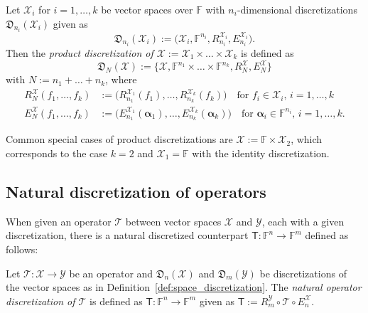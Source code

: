 \documentclass[a4paper]{paper}
\newcommand{\Discr}{\mathfrak{D}}
\newcommand{\Spc}[1]{\mathscr{#1}}
\newcommand{\Field}{\mathbb{F}}
\newcommand{\Op}[1]{\mathcal{#1}}
\newcommand{\DiscOp}[1]{\mathsf{#1}}
\newcommand*{\EXT}[2]{\ensuremath{E_{#1}^{#2}}}
\newcommand*{\REST}[2]{\ensuremath{R_{#1}^{#2}}}
\newcommand*{\RmY}{\ensuremath{\REST{m}{\Spc{Y}}}}
\newcommand*{\EnX}{\ensuremath{\EXT{n}{\Spc{X}}}}
\newcommand{\valpha}{\boldsymbol{\alpha}}
\begin{document}
\begin{definition}
 \label{def:product_space_discretization}
 Let $\Spc{X}_i$ for $i=1,\ldots,k$ be vector spaces over $\Field$ with $n_i$-dimensional discretizations 
 $\Discr_{n_i}(\Spc{X}_i)$ given as
 \begin{equation*}
  \Discr_{n_i}(\Spc{X}_i) := \bigl( \Spc{X}_i, \Field^{n_i}, \REST{n_i}{\Spc{X}_i}, \EXT{n_i}{\Spc{X}_i} \bigr). 
 \end{equation*}
 Then the \emph{product discretization of $\Spc{X} := \Spc{X}_1 \times \ldots \times \Spc{X}_k$} is defined as 
 \begin{equation*}
  \Discr_{N}(\Spc{X}):=\{\Spc{X}, \Field^{n_1} \times \ldots \times \Field^{n_k}, R_{N}^{\Spc{X}}, E_{N}^{\Spc{X}} \}
 \end{equation*}
 with $N := n_1 + \ldots + n_k$, where
 \begin{align*}
  \REST{N}{\Spc{X}}(f_1,\ldots,f_k) &:= \bigl( \REST{n_1}{\Spc{X}_1}(f_1),\ldots,\REST{n_k}{\Spc{X}_k}(f_k) \bigr)
   \quad\text{for $f_i\in \Spc{X}_i$, $i=1,\ldots,k$} \\
  \EXT{N}{\Spc{X}}(f_1,\ldots,f_k) &:= \bigl( \EXT{n_1}{\Spc{X}_1}(\valpha_1),\ldots,\EXT{n_k}{\Spc{X}_k}(\valpha_k) 
\bigr)
   \quad\text{for $\valpha_i\in \Field^{n_i}$, $i=1,\ldots,k$.}
 \end{align*}
\end{definition}

%
Common special cases of product discretizations are $\Spc{X}:=\Field \times \Spc{X}_2$, which corresponds to the case 
$k=2$ and $\Spc{X}_1=\Field$ with the identity discretization.


\subsection{Natural discretization of operators}

When given an operator $\Op{T}$ between vector spaces $\Spc{X}$ and $\Spc{Y}$, each with a given discretization, 
there is a natural discretized counterpart $\DiscOp{T} \colon \Field^n \to \Field^m$ defined as follows:

\begin{definition}
 \label{def:operator_discretization}
 Let $\Op{T}\colon \Spc{X} \to \Spc{Y}$ be an operator and $\Discr_n(\Spc{X})$ and $\Discr_m(\Spc{Y})$ be 
 discretizations of the vector spaces as in Definition~\ref{def:space_discretization}. The \emph{natural operator 
 discretization of $\Op{T}$} is defined as $\DiscOp{T} \colon \Field^n \to \Field^m$ given as 
 $\DiscOp{T} := \RmY \circ \Op{T} \circ \EnX$.
\end{definition}
\end{document}
